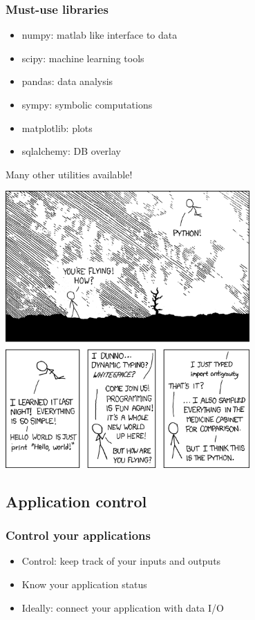 \documentclass[14pt]{beamer}
\begin{document}
\begin{frame}
\frametitle{Must-use libraries}
\begin{itemize}
\item numpy: matlab like interface to data
\item scipy: machine learning tools
\item pandas: data analysis
\item sympy: symbolic computations
\item matplotlib: plots
\item sqlalchemy: DB overlay
\end{itemize}
Many other utilities available!
\end{frame}

\begin{frame}
\centering
\includegraphics[width=0.7\textwidth]{python}

\end{frame}

\subsection{Application control}
\begin{frame}
\frametitle{Control your applications}
\begin{itemize}
\item Control: keep track of your inputs and outputs
\item Know your application status
\item Ideally: connect your application with data I/O
\end{itemize}
\end{frame}
\end{document}
